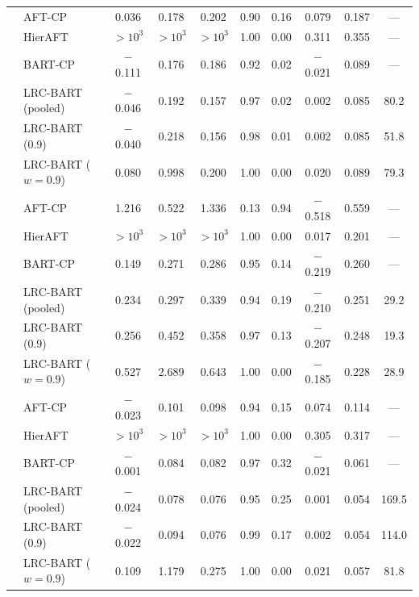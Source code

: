 \begin{longtable}{llcccccccc}
\midrule
{} & AFT-CP & 0.036 & 0.178 & 0.202 & 0.90 & 0.16 & 0.079 & 0.187 & --- \\*
& HierAFT & $>\!10^{3}$ & $>\!10^{3}$ & $>\!10^{3}$ & 1.00 & 0.00 & 0.311 & 0.355 & --- \\*
& BART-CP & $-$0.111 & 0.176 & 0.186 & 0.92 & 0.02 & $-$0.021 & 0.089 & --- \\*
& LRC-BART (pooled) & $-$0.046 & 0.192 & 0.157 & 0.97 & 0.02 & 0.002 & 0.085 & 80.2 \\*
& LRC-BART (0.9) & $-$0.040 & 0.218 & 0.156 & 0.98 & 0.01 & 0.002 & 0.085 & 51.8 \\*
& LRC-BART ($w=0.9$) & 0.080 & 0.998 & 0.200 & 1.00 & 0.00 & 0.020 & 0.089 & 79.3 \\
\midrule
{} & AFT-CP & 1.216 & 0.522 & 1.336 & 0.13 & 0.94 & $-$0.518 & 0.559 & --- \\*
& HierAFT & $>\!10^{3}$ & $>\!10^{3}$ & $>\!10^{3}$ & 1.00 & 0.00 & 0.017 & 0.201 & --- \\*
& BART-CP & 0.149 & 0.271 & 0.286 & 0.95 & 0.14 & $-$0.219 & 0.260 & --- \\*
& LRC-BART (pooled) & 0.234 & 0.297 & 0.339 & 0.94 & 0.19 & $-$0.210 & 0.251 & 29.2 \\*
& LRC-BART (0.9) & 0.256 & 0.452 & 0.358 & 0.97 & 0.13 & $-$0.207 & 0.248 & 19.3 \\*
& LRC-BART ($w=0.9$) & 0.527 & 2.689 & 0.643 & 1.00 & 0.00 & $-$0.185 & 0.228 & 28.9 \\
\midrule
{} & AFT-CP & $-$0.023 & 0.101 & 0.098 & 0.94 & 0.15 & 0.074 & 0.114 & --- \\*
& HierAFT & $>\!10^{3}$ & $>\!10^{3}$ & $>\!10^{3}$ & 1.00 & 0.00 & 0.305 & 0.317 & --- \\*
& BART-CP & $-$0.001 & 0.084 & 0.082 & 0.97 & 0.32 & $-$0.021 & 0.061 & --- \\*
& LRC-BART (pooled) & $-$0.024 & 0.078 & 0.076 & 0.95 & 0.25 & 0.001 & 0.054 & 169.5 \\*
& LRC-BART (0.9) & $-$0.022 & 0.094 & 0.076 & 0.99 & 0.17 & 0.002 & 0.054 & 114.0 \\*
& LRC-BART ($w=0.9$) & 0.109 & 1.179 & 0.275 & 1.00 & 0.00 & 0.021 & 0.057 & 81.8 \\

\end{longtable}
